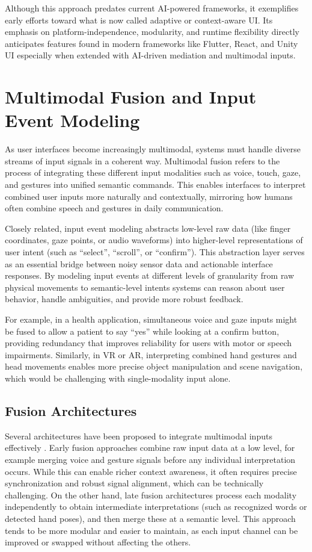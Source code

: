 \documentclass[openany]{book}
\begin{document}
Although this approach predates current AI-powered frameworks, it exemplifies early efforts toward what is now called adaptive or context-aware UI. Its emphasis on platform-independence, modularity, and runtime flexibility directly anticipates features found in modern frameworks like Flutter, React, and Unity UI especially when extended with AI-driven mediation and multimodal inputs.

\section{Multimodal Fusion and Input Event Modeling}
As user interfaces become increasingly multimodal, systems must handle diverse streams of input signals in a coherent way. Multimodal fusion refers to the process of integrating these different input modalities such as voice, touch, gaze, and gestures into unified semantic commands.  This enables interfaces to interpret combined user inputs more naturally and contextually, mirroring how humans often combine speech and gestures in daily communication.

Closely related, input event modeling abstracts low-level raw data (like finger coordinates, gaze points, or audio waveforms) into higher-level representations of user intent (such as “select”, “scroll”, or “confirm”). This abstraction layer serves as an essential bridge between noisy sensor data and actionable interface responses. By modeling input events at different levels of granularity from raw physical movements to semantic-level intents systems can reason about user behavior, handle ambiguities, and provide more robust feedback.

For example, in a health application, simultaneous voice and gaze inputs might be fused to allow a patient to say “yes” while looking at a confirm button, providing redundancy that improves reliability for users with motor or speech impairments. Similarly, in VR or AR, interpreting combined hand gestures and head movements enables more precise object manipulation and scene navigation, which would be challenging with single-modality input alone.

\subsection{Fusion Architectures}
Several architectures have been proposed to integrate multimodal inputs effectively \cite{AtreyMultimodal}. Early fusion approaches combine raw input data at a low level, for example merging voice and gesture signals before any individual interpretation occurs. While this can enable richer context awareness, it often requires precise synchronization and robust signal alignment, which can be technically challenging.
On the other hand, late fusion architectures process each modality independently to obtain intermediate interpretations (such as recognized words or detected hand poses), and then merge these at a semantic level. This approach tends to be more modular and easier to maintain, as each input channel can be improved or swapped without affecting the others.
\end{document}
